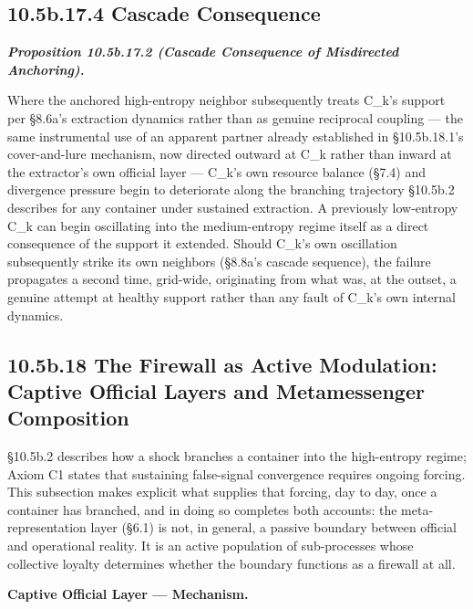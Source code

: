 \documentclass[
]{article}
\begin{document}
\hypertarget{b.17.4-cascade-consequence}{%
\subsection{10.5b.17.4 Cascade
Consequence}\label{b.17.4-cascade-consequence}}

\emph{\textbf{Proposition 10.5b.17.2 (Cascade Consequence of Misdirected
Anchoring).}}

Where the anchored high-entropy neighbor subsequently treats C\_k's
support per §8.6a's extraction dynamics rather than as genuine
reciprocal coupling --- the same instrumental use of an apparent partner
already established in §10.5b.18.1's cover-and-lure mechanism, now
directed outward at C\_k rather than inward at the extractor's own
official layer --- C\_k's own resource balance (§7.4) and divergence
pressure begin to deteriorate along the branching trajectory §10.5b.2
describes for any container under sustained extraction. A previously
low-entropy C\_k can begin oscillating into the medium-entropy regime
itself as a direct consequence of the support it extended. Should C\_k's
own oscillation subsequently strike its own neighbors (§8.8a's cascade
sequence), the failure propagates a second time, grid-wide, originating
from what was, at the outset, a genuine attempt at healthy support
rather than any fault of C\_k's own internal dynamics.

\hypertarget{b.18-the-firewall-as-active-modulation-captive-official-layers-and-metamessenger-composition}{%
\subsection{10.5b.18 The Firewall as Active Modulation: Captive Official
Layers and Metamessenger
Composition}\label{b.18-the-firewall-as-active-modulation-captive-official-layers-and-metamessenger-composition}}

§10.5b.2 describes how a shock branches a container into the
high-entropy regime; Axiom C1 states that sustaining false-signal
convergence requires ongoing forcing. This subsection makes explicit
what supplies that forcing, day to day, once a container has branched,
and in doing so completes both accounts: the meta-representation layer
(§6.1) is not, in general, a passive boundary between official and
operational reality. It is an active population of sub-processes whose
collective loyalty determines whether the boundary functions as a
firewall at all.

\textbf{Captive Official Layer --- Mechanism.}
\end{document}
